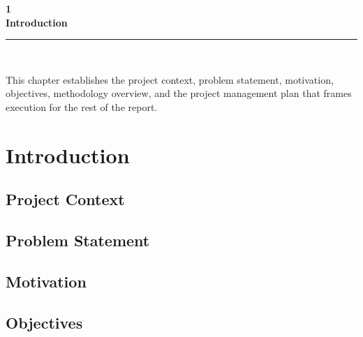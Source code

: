 \documentclass[11pt,a4paper]{article}
\begin{document}
\listoffigures
\newpage

\listoftables
\newpage

\setcounter{page}{1}

\newcommand{\chapterintro}[3]{%
\clearpage
\thispagestyle{empty}%
\vspace*{2cm}%
\begin{center}
    {\fontsize{72}{72}\selectfont \textbf{#1}}\\[0.6cm]
    {\LARGE\bfseries #2}\\[0.6cm]
    \rule{0.75\textwidth}{0.6pt}\\[0.6cm]
    \parbox{0.75\textwidth}{\large #3}
\end{center}
\vfill
\clearpage
}

\chapterintro{1}{Introduction}{This chapter establishes the project context, problem statement, motivation, objectives, methodology overview, and the project management plan that frames execution for the rest of the report.}
\section{Introduction}
\label{sec:introduction}

\subsection{Project Context}


\subsection{Problem Statement}


\subsection{Motivation}


\subsection{Objectives}

\end{document}
